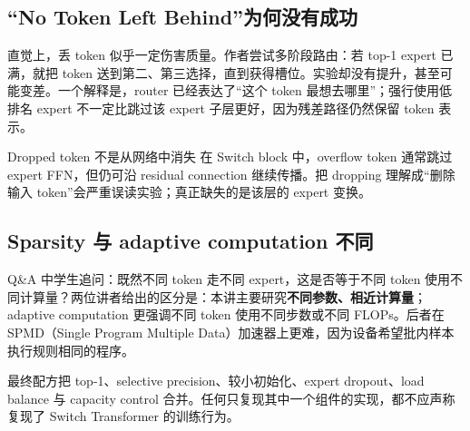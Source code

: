 \subsection{“No Token Left Behind”为何没有成功}

直觉上，丢 token 似乎一定伤害质量。作者尝试多阶段路由：若 top-1 expert 已满，就把 token 送到第二、第三选择，直到获得槽位。实验却没有提升，甚至可能变差。一个解释是，router 已经表达了“这个 token 最想去哪里”；强行使用低排名 expert 不一定比跳过该 expert 子层更好，因为残差路径仍然保留 token 表示。



\begin{warningbox}{Dropped token 不是从网络中消失}
在 Switch block 中，overflow token 通常跳过 expert FFN，但仍可沿 residual connection 继续传播。把 dropping 理解成“删除输入 token”会严重误读实验；真正缺失的是该层的 expert 变换。
\end{warningbox}

\subsection{Sparsity 与 adaptive computation 不同}

Q\&A 中学生追问：既然不同 token 走不同 expert，这是否等于不同 token 使用不同计算量？两位讲者给出的区分是：本讲主要研究\textbf{不同参数、相近计算量}；adaptive computation 更强调不同 token 使用不同步数或不同 FLOPs。后者在 SPMD（Single Program Multiple Data）加速器上更难，因为设备希望批内样本执行规则相同的程序。


最终配方把 top-1、selective precision、较小初始化、expert dropout、load balance 与 capacity control 合并。任何只复现其中一个组件的实现，都不应声称复现了 Switch Transformer 的训练行为。


